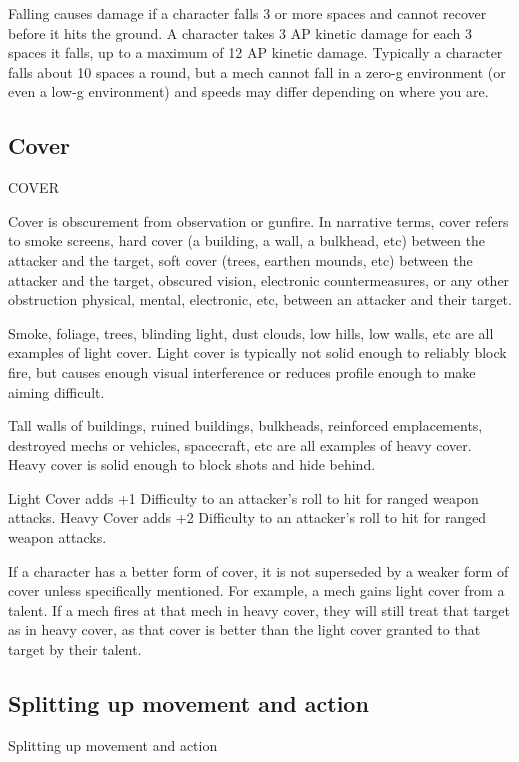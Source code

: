 Falling causes damage if a character falls 3 or more spaces and cannot recover before it hits the
ground. A character takes 3 AP kinetic damage for each 3 spaces it falls, up to a maximum of 12
AP kinetic damage. Typically a character falls about 10 spaces a round, but a mech cannot fall in
a zero-g environment (or even a low-g environment) and speeds may differ depending on where
you are.

\subsection{Cover}
                                                     COVER

Cover is obscurement from observation or gunfire. In narrative terms, cover refers to smoke
screens, hard cover (a building, a wall, a bulkhead, etc) between the attacker and the target, soft
cover (trees, earthen mounds, etc) between the attacker and the target, obscured vision,
electronic countermeasures, or any other obstruction physical, mental, electronic, etc, between an
attacker and their target.




Smoke, foliage, trees, blinding light, dust clouds, low hills, low walls, etc are all examples of light
cover. Light cover is typically not solid enough to reliably block fire, but causes enough visual
interference or reduces profile enough to make aiming difficult.

Tall walls of buildings, ruined buildings, bulkheads, reinforced emplacements, destroyed mechs
or vehicles, spacecraft, etc are all examples of heavy cover. Heavy cover is solid enough to
block shots and hide behind.

Light Cover adds +1 Difficulty to an attacker’s roll to hit for ranged weapon attacks.
Heavy Cover adds +2 Difficulty to an attacker’s roll to hit for ranged weapon attacks.

If a character has a better form of cover, it is not superseded by a weaker form of cover unless
specifically mentioned. For example, a mech gains light cover from a talent. If a mech fires at that
mech in heavy cover, they will still treat that target as in heavy cover, as that cover is better than
the light cover granted to that target by their talent.

\subsection{Splitting up movement and action}
                              Splitting up movement and action

